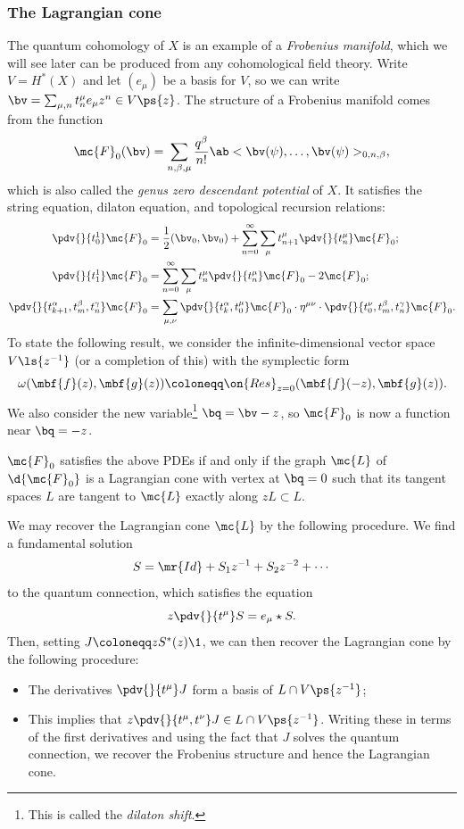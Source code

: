 \subsubsection{The Lagrangian cone}%
\label{ssub:The Lagrangian cone}

The quantum cohomology of \(X\) is an example of a \textit{Frobenius manifold}, which we will see later can be produced from any cohomological field theory. Write \(V = H^*(X)\) and let \((e_{\mu})\) be a basis for \(V\), so we can write $\bv = \sum_{\mu,n} t^{\mu}_n e_{\mu} z^n \in V\ps{z}$.
The structure of a Frobenius manifold comes from the function
\[
    \mc{F}_0(\bv) = \sum_{n, \beta, \mu} \frac{q^{\beta}}{n!} \ab<\bv(\psi), \ldots, \bv(\psi)>_{0,n,\beta},
\]
which is also called the \textit{genus zero descendant potential} of \(X\). It satisfies the string equation, dilaton equation, and topological recursion relations: 
\begin{align*}
    \pdv{}{t_0^1} \mc{F}_0 &= \frac{1}{2} (\bv_0, \bv_0) + \sum_{n=0}^{\infty} \sum_{\mu} t_{n+1}^{\mu} \pdv{}{t_n^{\mu}} \mc{F}_0; \\
    \pdv{}{t_1^1} \mc{F}_0 &= \sum_{n=0}^{\infty} \sum_{\mu} t_n^{\mu} \pdv{}{t_n^{\mu}}\mc{F}_0 - 2 \mc{F}_0; \\
    \pdv{}{t_{k+1}^{\alpha},t_m^{\beta},t_n^{\gamma}} \mc{F}_0 &= \sum_{\mu,\nu} \pdv{}{t_k^{\alpha},t_0^{\mu}} \mc{F}_0 \cdot \eta^{\mu\nu} \cdot \pdv{}{t_0^{\nu},t_{m}^{\beta},t_n^{\gamma}} \mc{F}_0.
\end{align*}
To state the following result, we consider the infinite-dimensional vector space $V\ls{z^{-1}}$ (or a completion of this) with the symplectic form
\[ \omega(\mbf{f}(z), \mbf{g}(z)) \coloneqq \on{Res}_{z=0}(\mbf{f}(-z), \mbf{g}(z)). \]
We also consider the new variable\footnote{This is called the \textit{dilaton shift}.} $\bq = \bv - z$, so $\mc{F}_0$ is now a function near $\bq = -z$.

\begin{thm}
    $\mc{F}_0$ satisfies the above PDEs if and only if the graph $\mc{L}$ of $\d{\mc{F}_0}$ is a Lagrangian cone with vertex at $\bq = 0$ such that its tangent spaces $L$ are tangent to $\mc{L}$ exactly along $zL \subset L$.
\end{thm}

We may recover the Lagrangian cone $\mc{L}$ by the following procedure. We find a fundamental solution 
\[ S = \mr{Id} + S_1 z^{-1} + S_2 z^{-2} + \cdots \]
to the quantum connection, which satisfies the equation
\[ z \pdv{}{t^{\mu}}S = e_{\mu} \star S. \]
Then, setting $J \coloneqq z S^*(z) \1$, we can then recover the Lagrangian cone by the following procedure:
\begin{itemize}
    \item The derivatives $\pdv{}{t^{\mu}} J$ form a basis of $L \cap V\ps{z^{-1}}$;
    \item This implies that $z \pdv{}{t^{\mu},t^{\nu}} J \in L \cap V \ps{z^{-1}}$. Writing these in terms of the first derivatives and using the fact that $J$ solves the quantum connection, we recover the Frobenius structure and hence the Lagrangian cone.
\end{itemize}

